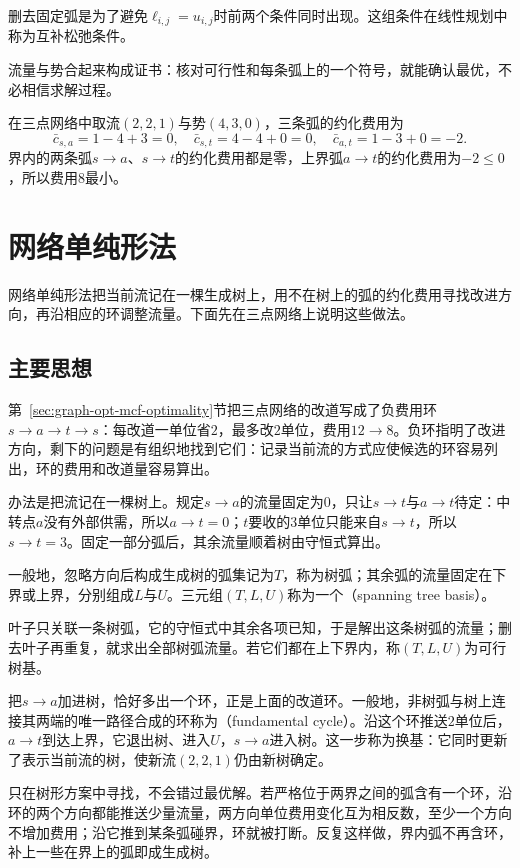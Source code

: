 删去固定弧是为了避免$\ell_{i,j}=u_{i,j}$时前两个条件同时出现。这组条件在线性规划中称为互补松弛条件。

流量与势合起来构成证书：核对可行性和每条弧上的一个符号，就能确认最优，不必相信求解过程。

在三点网络中取流$(2,2,1)$与势$(4,3,0)$，三条弧的约化费用为
\[
  \bar c_{s,a}=1-4+3=0,\quad\bar c_{s,t}=4-4+0=0,\quad\bar c_{a,t}=1-3+0=-2.
\]
界内的两条弧$s\to a$、$s\to t$的约化费用都是零，上界弧$a\to t$的约化费用为$-2\leq0$，所以费用$8$最小。

\section{网络单纯形法}
\label{sec:graph-opt-network-simplex}

网络单纯形法把当前流记在一棵生成树上，用不在树上的弧的约化费用寻找改进方向，再沿相应的环调整流量。下面先在三点网络上说明这些做法。

\subsection{主要思想}

第~\ref{sec:graph-opt-mcf-optimality}节把三点网络的改道写成了负费用环$s\to a\to t\to s$：每改道一单位省$2$，最多改$2$单位，费用$12\to8$。负环指明了改进方向，剩下的问题是有组织地找到它们：记录当前流的方式应使候选的环容易列出，环的费用和改道量容易算出。

办法是把流记在一棵树上。规定$s\to a$的流量固定为$0$，只让$s\to t$与$a\to t$待定：中转点$a$没有外部供需，所以$a\to t=0$；$t$要收的$3$单位只能来自$s\to t$，所以$s\to t=3$。固定一部分弧后，其余流量顺着树由守恒式算出。

一般地，忽略方向后构成生成树的弧集记为$T$，称为树弧；其余弧的流量固定在下界或上界，分别组成$L$与$U$。三元组$(T,L,U)$称为一个（spanning tree basis）。

叶子只关联一条树弧，它的守恒式中其余各项已知，于是解出这条树弧的流量；删去叶子再重复，就求出全部树弧流量。若它们都在上下界内，称$(T,L,U)$为可行树基。

把$s\to a$加进树，恰好多出一个环，正是上面的改道环。一般地，非树弧与树上连接其两端的唯一路径合成的环称为（fundamental cycle）。沿这个环推送$2$单位后，$a\to t$到达上界，它退出树、进入$U$，$s\to a$进入树。这一步称为换基：它同时更新了表示当前流的树，使新流$(2,2,1)$仍由新树确定。

只在树形方案中寻找，不会错过最优解。若严格位于两界之间的弧含有一个环，沿环的两个方向都能推送少量流量，两方向单位费用变化互为相反数，至少一个方向不增加费用；沿它推到某条弧碰界，环就被打断。反复这样做，界内弧不再含环，补上一些在界上的弧即成生成树。

